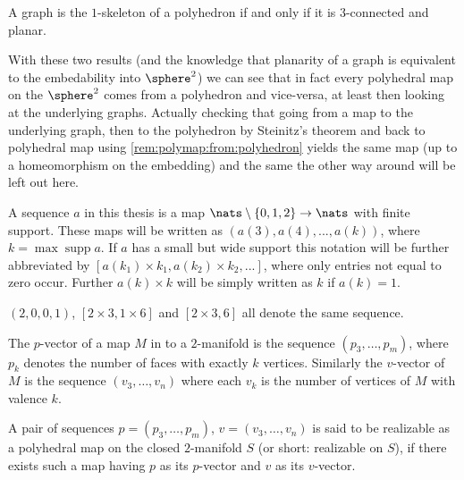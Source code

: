 \begin{theorem} A graph is the $1$-skeleton of a polyhedron if and only if it is $3$-connected and planar.
\end{theorem}

With these two results (and the knowledge that planarity of a graph is equivalent to the embedability into $\sphere^2$) we can see that in fact every polyhedral map on the $\sphere^2$ comes from a polyhedron and vice-versa, at least then looking at the underlying graphs. Actually checking that going from a map to the underlying graph, then to the polyhedron by {\sc Steinitz's} theorem and back to polyhedral map using \autoref{rem:polymap:from:polyhedron} yields the same map (up to a homeomorphism on the embedding) and the same the other way around will be left out here.

\begin{definition}[Sequence]
  A sequence $a$ in this thesis is a map $\nats \setminus \{0, 1, 2\} \rightarrow \nats$ with finite support. These maps will be written as $(a(3), a(4), ..., a(k))$, where $k = \operatorname{max} \operatorname{supp} a$. If $a$ has a small but wide support this notation will be further abbreviated by $[a(k_1) \times k_1, a(k_2) \times k_2, ...]$, where only entries not equal to zero occur. Further $a(k) \times k$ will be simply written as $k$ if $a(k) = 1$.
\end{definition}
\begin{example}
  $(2, 0, 0, 1)$, $[2 \times 3, 1 \times 6]$ and $[2 \times 3, 6]$ all denote the same sequence.
\end{example}
\begin{definition}\label{def:relizable}
  The $p$-vector of a map $M$ in to a $2$-manifold is the sequence $(p_3, \dots, p_m)$, where $p_k$ denotes the number of faces with exactly $k$ vertices. Similarly the $v$-vector of $M$ is the sequence $(v_3, \dots, v_n)$ where each $v_k$ is the number of vertices of $M$ with valence $k$.
\end{definition}

\begin{definition}\label{def:realizable}
  A pair of sequences $p = (p_3, \dots, p_m)$, $v = (v_3, \dots, v_n)$ is said to be realizable as a polyhedral map on the closed $2$-manifold $S$ (or short: realizable on $S$), if there exists such a map having $p$ as its $p$-vector and $v$ as its $v$-vector.
\end{definition}

